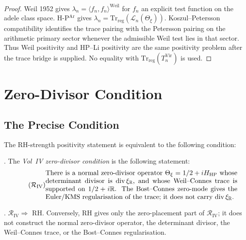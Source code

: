 \begin{proof}
Weil 1952 gives \(\lambda_{n}=\langle f_{n},f_{n}\rangle^{\mathrm{Weil}}\)
for \(f_{n}\) an explicit test function on the adele class space.
H-P\(^{\mathrm{Ar}}\) gives
\(\lambda_{n}=\mathrm{Tr}_{\mathrm{reg}}(\mathcal L_n(\Theta_{\xi}))\).
Koszul--Petersson compatibility identifies the trace pairing with the
Petersson pairing on the arithmetic primary sector whenever the
admissible Weil test lies in that sector. Thus Weil positivity and
HP--Li positivity are the same positivity problem after the trace
bridge is supplied. No equality with
\(\mathrm{Tr}_{\mathrm{reg}}(T_{n}^{\mathrm{Vir}})\) is used.
\end{proof}

\section{Zero-Divisor Condition}
\label{v4-arith:vb:residual-obstruction}

\subsection{The Precise Condition}
\label{v4-arith:vb:precise-residual}

The RH-strength positivity statement is equivalent to the following
condition:

\begin{definition}
\label{v4-arith:vb:def:residual}
\ClaimStatusDefinitional. The \emph{Vol~IV zero-divisor condition} is
the following statement:
\begin{equation}
\label{v4-arith:vb:eq:residual}
\tag{\(\mathcal{R}_{\mathrm{IV}}\)}
\parbox{0.82\linewidth}{%
There is a normal zero-divisor operator
\(\Theta_{\xi}=1/2+iH_{\mathrm{HP}}\) whose determinant divisor is
\(\mathrm{div}\,\xi_{\mathbb R}\), and whose
Weil--Connes trace is supported on
\(1/2+i\mathbb R\). The Bost--Connes zero-mode gives the Euler/KMS
regularisation of the trace; it does not carry
\(\mathrm{div}\,\xi_{\mathbb R}\).%
}
\end{equation}
\end{definition}

\begin{theorem}
\label{v4-arith:vb:thm:residual-is-RH}
\ClaimStatusProvedHere. \(\mathcal{R}_{\mathrm{IV}}\Rightarrow\) RH.
Conversely, RH gives only the zero-placement part of
\(\mathcal{R}_{\mathrm{IV}}\); it does not construct the normal
zero-divisor operator, the determinant divisor, the Weil--Connes
trace, or the Bost--Connes regularisation.
\end{theorem}

